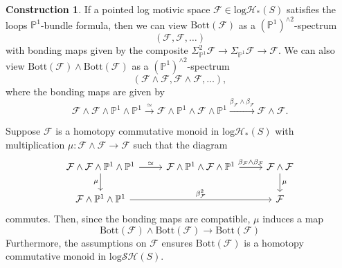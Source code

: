 \documentclass[11pt, a4paper]{amsart}
\theoremstyle{definition}
\newtheorem{const}[thm]{Construction}
\numberwithin{equation}{subsection}
\renewcommand{\P}{\mathbb{P}}
\newcommand{\Bott}{\mathrm{Bott}}
\newcommand{\cF}{\mathcal{F}}
\newcommand{\inflogHpt}{\mathrm{log}\mathcal{H}_\ast}
\newcommand{\inflogSH}{\mathrm{log}\mathcal{SH}}
\begin{document}
\begin{const}
\label{K-theory.19}
If a pointed log motivic space $\cF\in \inflogHpt(S)$ satisfies the loops $\P^1$-bundle formula,
then we can view $\Bott(\cF)$ as a $(\P^1)^{\wedge 2}$-spectrum
\begin{equation}
\label{K-theory.19.1}
(\cF,\cF,\ldots)
\end{equation}
with bonding maps given by the composite $\Sigma_{\P^1}^2\cF\to \Sigma_{\P^1}\cF\to \cF$.
We can also view $\Bott(\cF)\wedge \Bott(\cF)$ as a $(\P^1)^{\wedge 2}$-spectrum
\begin{equation}
\label{K-theory.19.2}
(\cF\wedge \cF,\cF\wedge \cF,\ldots),
\end{equation}
where the bonding maps are given by
\[
\cF\wedge \cF\wedge \P^1\wedge \P^1
\xrightarrow{\simeq}
\cF\wedge \P^1\wedge \cF\wedge \P^1
\xrightarrow{\beta_{\cF}\wedge \beta_{\cF}}
\cF\wedge \cF.
\]

Suppose $\cF$ is a homotopy commutative monoid in $\inflogHpt(S)$ with multiplication 
$\mu\colon \cF\wedge \cF\to \cF$ such that the diagram
\begin{equation}
\label{K-theory.19.3}
\begin{tikzcd}
\cF\wedge \cF\wedge \P^1\wedge \P^1\ar[r,"\simeq"]\ar[d,"\mu"']&
\cF\wedge \P^1\wedge \cF\wedge \P^1\ar[r,"\beta_{\cF}\wedge \beta_{\cF}"]&
\cF\wedge \cF\ar[d,"\mu"]
\\
\cF\wedge \P^1\wedge \P^1\ar[rr,"\beta_{\cF}^2"]&
&
\cF
\end{tikzcd}
\end{equation}
commutes. 
Then, since the bonding maps are compatible, $\mu$ induces a map
\[
\Bott(\cF)\wedge \Bott(\cF)\to \Bott(\cF)
\]
Furthermore, 
the assumptions on $\cF$ ensures $\Bott(\cF)$ is a homotopy commutative monoid in $\inflogSH(S)$.


\end{const}
\end{document}
